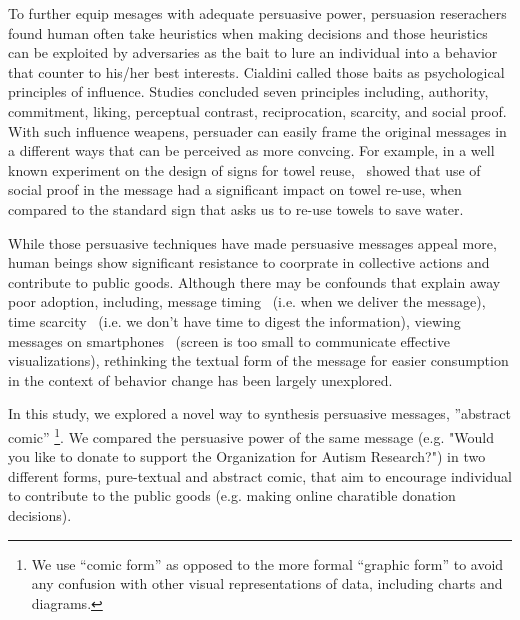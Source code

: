To further equip mesages with adequate persuasive power, persuasion reserachers found human often take heuristics when making decisions and those heuristics can be exploited by adversaries as the bait to lure an individual into a behavior that counter to his/her best interests. Cialdini called those baits as psychological principles of influence. Studies concluded seven principles including, authority, commitment, liking, perceptual contrast, reciprocation, scarcity, and social proof. With such influence weapens, persuader can easily frame the original messages in a different ways that can be perceived as more convcing. For example, in a well known experiment on the design of signs for towel reuse,~\textcite{goldstein2008room} showed that use of social proof in the message had a significant impact on towel re-use, when compared to the standard sign that asks us to re-use towels to save water. 

While those persuasive techniques have made persuasive messages appeal more, human beings show significant resistance to coorprate in collective actions and contribute to public goods. Although there may be confounds that explain away poor adoption, including, message timing~\textcite{Fogg2009} (i.e. when we deliver the message), time scarcity~\textcite{Janssen2016} (i.e. we don't have time to digest the information), viewing messages on smartphones~\textcite{Kim2016} (screen is too small to communicate effective visualizations), rethinking the textual form of the message for easier consumption in the context of behavior change has been largely unexplored.

In this study, we explored a novel way to synthesis persuasive messages, ''abstract comic'' \footnote{We use ``comic form'' as opposed to the more formal ``graphic form'' to avoid any confusion with other visual representations of data, including charts and diagrams.}. We compared the persuasive power of the same message (e.g. "Would you like to donate to support the Organization for Autism Research?") in two different forms, pure-textual and abstract comic, that aim to encourage individual to contribute to the public goods (e.g. making online charatible donation decisions). 
 
